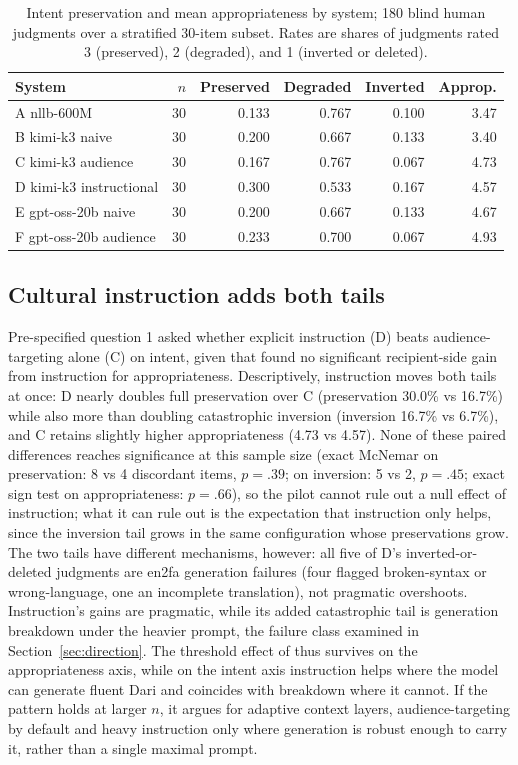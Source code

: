 \documentclass[11pt]{article}
\begin{document}
\begin{table}[t]
\centering\small
\begin{tabular}{lrrrrr}
\toprule
System & $n$ & Preserved & Degraded & Inverted & Approp. \\
\midrule
A nllb-600M & 30 & 0.133 & 0.767 & 0.100 & 3.47 \\
B kimi-k3 naive & 30 & 0.200 & 0.667 & 0.133 & 3.40 \\
C kimi-k3 audience & 30 & 0.167 & 0.767 & 0.067 & 4.73 \\
D kimi-k3 instructional & 30 & 0.300 & 0.533 & 0.167 & 4.57 \\
E gpt-oss-20b naive & 30 & 0.200 & 0.667 & 0.133 & 4.67 \\
F gpt-oss-20b audience & 30 & 0.233 & 0.700 & 0.067 & 4.93 \\
\bottomrule
\end{tabular}
\caption{Intent preservation and mean appropriateness by system; 180 blind human judgments over a stratified 30-item subset. Rates are shares of judgments rated 3 (preserved), 2 (degraded), and 1 (inverted or deleted).}
\label{tab:overall}
\end{table}

\subsection{Cultural instruction adds both tails}
Pre-specified question 1 asked whether explicit instruction (D) beats audience-targeting alone (C) on intent, given that \citet{tenzer2026pragmatics} found no significant recipient-side gain from instruction for appropriateness. Descriptively, instruction moves both tails at once: D nearly doubles full preservation over C (preservation 30.0\% vs 16.7\%) while also more than doubling catastrophic inversion (inversion 16.7\% vs 6.7\%), and C retains slightly higher appropriateness (4.73 vs 4.57). None of these paired differences reaches significance at this sample size (exact McNemar on preservation: 8 vs 4 discordant items, $p=.39$; on inversion: 5 vs 2, $p=.45$; exact sign test on appropriateness: $p=.66$), so the pilot cannot rule out a null effect of instruction; what it can rule out is the expectation that instruction only helps, since the inversion tail grows in the same configuration whose preservations grow. The two tails have different mechanisms, however: all five of D's inverted-or-deleted judgments are en2fa generation failures (four flagged broken-syntax or wrong-language, one an incomplete translation), not pragmatic overshoots. Instruction's gains are pragmatic, while its added catastrophic tail is generation breakdown under the heavier prompt, the failure class examined in Section~\ref{sec:direction}. The threshold effect of \citet{tenzer2026pragmatics} thus survives on the appropriateness axis, while on the intent axis instruction helps where the model can generate fluent Dari and coincides with breakdown where it cannot. If the pattern holds at larger $n$, it argues for adaptive context layers, audience-targeting by default and heavy instruction only where generation is robust enough to carry it, rather than a single maximal prompt.
\end{document}
